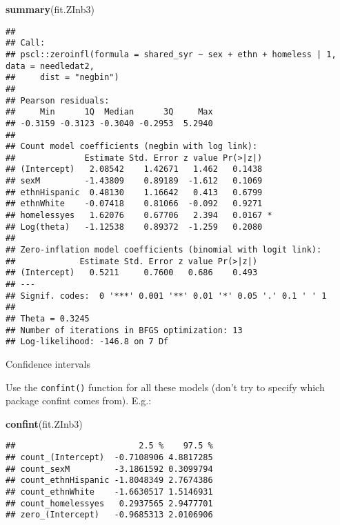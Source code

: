 \documentclass[
  ignorenonframetext,
]{beamer}
\newenvironment{Shaded}{\begin{snugshade}}{\end{snugshade}}
\newcommand{\KeywordTok}[1]{\textcolor[rgb]{0.13,0.29,0.53}{\textbf{#1}}}
\newcommand{\NormalTok}[1]{#1}
\begin{document}
\begin{frame}[fragile]{}
\protect\hypertarget{section-4}{}

\tiny

\begin{Shaded}
\begin{Highlighting}[]
\KeywordTok{summary}\NormalTok{(fit.ZInb3)}
\end{Highlighting}
\end{Shaded}

\begin{verbatim}
## 
## Call:
## pscl::zeroinfl(formula = shared_syr ~ sex + ethn + homeless | 1, data = needledat2, 
##     dist = "negbin")
## 
## Pearson residuals:
##     Min      1Q  Median      3Q     Max 
## -0.3159 -0.3123 -0.3040 -0.2953  5.2940 
## 
## Count model coefficients (negbin with log link):
##              Estimate Std. Error z value Pr(>|z|)  
## (Intercept)   2.08542    1.42671   1.462   0.1438  
## sexM         -1.43809    0.89189  -1.612   0.1069  
## ethnHispanic  0.48130    1.16642   0.413   0.6799  
## ethnWhite    -0.07418    0.81066  -0.092   0.9271  
## homelessyes   1.62076    0.67706   2.394   0.0167 *
## Log(theta)   -1.12538    0.89372  -1.259   0.2080  
## 
## Zero-inflation model coefficients (binomial with logit link):
##             Estimate Std. Error z value Pr(>|z|)
## (Intercept)   0.5211     0.7600   0.686    0.493
## ---
## Signif. codes:  0 '***' 0.001 '**' 0.01 '*' 0.05 '.' 0.1 ' ' 1 
## 
## Theta = 0.3245 
## Number of iterations in BFGS optimization: 13 
## Log-likelihood: -146.8 on 7 Df
\end{verbatim}

\end{frame}

\begin{frame}[fragile]{Confidence intervals}
\protect\hypertarget{confidence-intervals}{}

Use the \texttt{confint()} function for all these models (don't try to
specify which package confint comes from). E.g.:

\begin{Shaded}
\begin{Highlighting}[]
\KeywordTok{confint}\NormalTok{(fit.ZInb3)}
\end{Highlighting}
\end{Shaded}

\begin{verbatim}
##                         2.5 %    97.5 %
## count_(Intercept)  -0.7108906 4.8817285
## count_sexM         -3.1861592 0.3099794
## count_ethnHispanic -1.8048349 2.7674386
## count_ethnWhite    -1.6630517 1.5146931
## count_homelessyes   0.2937565 2.9477701
## zero_(Intercept)   -0.9685313 2.0106906
\end{verbatim}

\end{frame}
\end{document}
